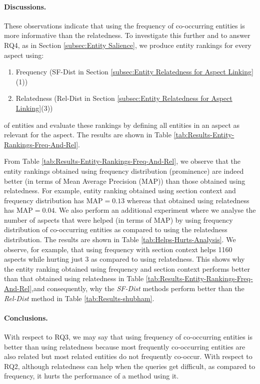 \paragraph{\textbf{Discussions.}}
These observations indicate that using the frequency of co-occurring entities is more informative than the relatedness. To investigate this further and to answer RQ4, as in Section \ref{subsec:Entity Salience}, we produce entity rankings for every aspect using:
\begin{enumerate}
    \item Frequency (SF-Dist in Section \ref{subsec:Entity Relatedness for Aspect Linking}(1))
    \item Relatedness (Rel-Dist in Section \ref{subsec:Entity Relatedness for Aspect Linking}(3))
\end{enumerate}
of entities and evaluate these rankings by defining all entities in an aspect as relevant for the aspect. The results are shown in Table \ref{tab:Results-Entity-Rankings-Freq-And-Rel}.

From Table \ref{tab:Results-Entity-Rankings-Freq-And-Rel}, we observe that the entity rankings obtained using frequency distribution (prominence) are indeed better (in terms of Mean Average Precision (MAP)) than those obtained using relatedness. For example, entity ranking obtained using section context and frequency distribution has $\text{MAP}=0.13$ whereas that obtained using relatedness has $\text{MAP}=0.04$. We also perform an additional experiment where we analyse the number of aspects that were helped (in terms of MAP) by using frequency distribution of co-occurring entities as compared to using the relatedness distribution. The results are shown in Table \ref{tab:Helps-Hurts-Analysis}. We observe, for example, that using frequency with section context helps 1160 aspects while hurting just 3 as compared to using relatedness. This shows why the entity ranking obtained using frequency and section context performs better than that obtained using relatedness in Table \ref{tab:Results-Entity-Rankings-Freq-And-Rel},and consequently, why the \textit{SF-Dist} methods perform better than the \textit{Rel-Dist} method in Table \ref{tab:Results-shubham}.

\paragraph{\textbf{Conclusions.}}
With respect to RQ3, we may say that using frequency of co-occurring entities is better than using relatedness because most frequently co-occurring entities are also related but most related entities do not frequently co-occur. With respect to RQ2, although relatedness can help when the queries get difficult, as compared to frequency, it hurts the performance of a method using it. 

